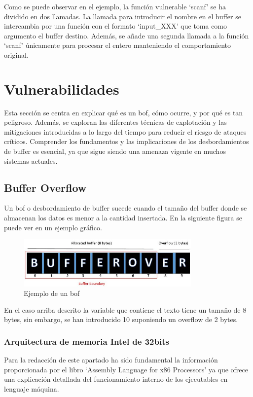 Como se puede observar en el ejemplo, la función vulnerable `scanf' se ha dividido en dos llamadas.
La llamada para introducir el nombre en el buffer se intercambia por una función con el formato `input\_XXX' que toma como argumento el buffer destino.
Además, se añade una segunda llamada a la función `scanf' únicamente para procesar el entero manteniendo el comportamiento original.

\section{Vulnerabilidades}
Esta sección se centra en explicar qué es un \acrfull{bof}, cómo ocurre, y por qué es tan peligroso.
Además, se exploran las diferentes técnicas de explotación y las mitigaciones introducidas a lo largo del tiempo para reducir el riesgo de ataques críticos.
Comprender los fundamentos y las implicaciones de los desbordamientos de buffer es esencial, ya que sigue siendo una amenaza vigente en muchos sistemas actuales.
\subsection{Buffer Overflow} \label{subsub:bofstack}
Un \acrfull{bof} o desbordamiento de buffer sucede cuando el tamaño del buffer donde se almacenan los datos es menor a la cantidad insertada.
En la siguiente figura se puede ver en un ejemplo gráfico.
\begin{figure}[htb!]
    \centering                        
    \includegraphics[width=0.8\textwidth]{images/BOF-Example.jpg}
    \caption{Ejemplo de un \acrlong{bof} }
    \label{fig:bofexample}
\end{figure}
\FloatBarrier
En el caso arriba descrito la variable que contiene el texto tiene un tamaño de 8 bytes, sin embargo, se han introducido 10 suponiendo un overflow de 2 bytes.

\subsubsection{Arquitectura de memoria Intel de 32bits}
Para la redacción de este apartado ha sido fundamental la información proporcionada por el libro `Assembly Language for x86 Processors' \cite{x86asm} ya que ofrece una explicación detallada del funcionamiento interno de los ejecutables en lenguaje máquina.


